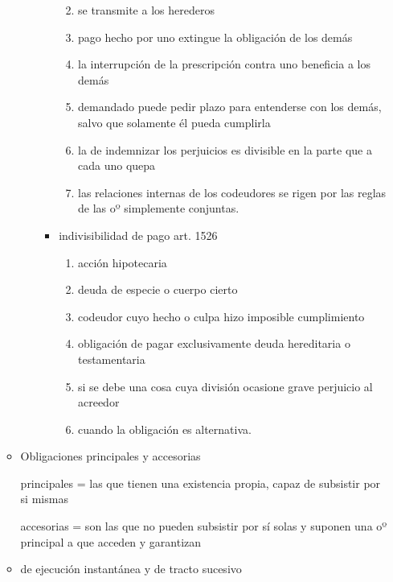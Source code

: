 \documentclass[]{article}
\providecommand{\tightlist}{%
  \setlength{\itemsep}{0pt}\setlength{\parskip}{0pt}}
\begin{document}
\begin{itemize}
\begin{itemize}
\begin{itemize}
\begin{itemize}
        \begin{enumerate}
        \def\labelenumi{\arabic{enumi}.}
        \tightlist
        \item
          se transmite a los herederos
        \item
          pago hecho por uno extingue la obligación de los demás
        \item
          la interrupción de la prescripción contra uno beneficia a los
          demás
        \item
          demandado puede pedir plazo para entenderse con los demás,
          salvo que solamente él pueda cumplirla
        \item
          la de indemnizar los perjuicios es divisible en la parte que a
          cada uno quepa
        \item
          las relaciones internas de los codeudores se rigen por las
          reglas de las oº simplemente conjuntas.
        \end{enumerate}
      \item
        indivisibilidad de pago art. 1526

        \begin{enumerate}
        \def\labelenumi{\arabic{enumi}.}
        \tightlist
        \item
          acción hipotecaria
        \item
          deuda de especie o cuerpo cierto
        \item
          codeudor cuyo hecho o culpa hizo imposible cumplimiento
        \item
          obligación de pagar exclusivamente deuda hereditaria o
          testamentaria
        \item
          si se debe una cosa cuya división ocasione grave perjuicio al
          acreedor
        \item
          cuando la obligación es alternativa.
        \end{enumerate}
      \end{itemize}
    \end{itemize}
  \item
    Obligaciones principales y accesorias

    principales = las que tienen una existencia propia, capaz de
    subsistir por si mismas

    accesorias = son las que no pueden subsistir por sí solas y suponen
    una oº principal a que acceden y garantizan
  \item
    de ejecución instantánea y de tracto sucesivo


\end{itemize}
\end{itemize}
\end{document}
